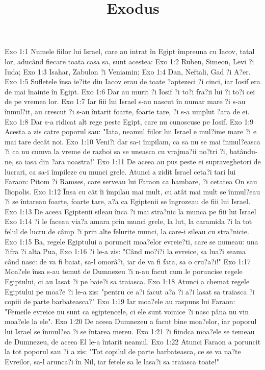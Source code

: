 

\title{Exodus}

Exo 1:1  Numele fiilor lui Israel, care au intrat în Egipt împreuna cu Iacov, tatal lor, aducând fiecare toata casa sa, sunt acestea:
Exo 1:2  Ruben, Simeon, Levi ?i Iuda;
Exo 1:3  Isahar, Zabulon ?i Veniamin;
Exo 1:4  Dan, Neftali, Gad ?i A?er.
Exo 1:5  Sufletele însa ie?ite din Iacov erau de toate ?aptezeci ?i cinci, iar Iosif era de mai înainte în Egipt.
Exo 1:6  Dar au murit ?i Iosif ?i to?i fra?ii lui ?i to?i cei de pe vremea lor.
Exo 1:7  Iar fiii lui Israel s-au nascut în numar mare ?i s-au înmul?it, au crescut ?i s-au întarit foarte, foarte tare, ?i s-a umplut ?ara de ei.
Exo 1:8  Dar s-a ridicat alt rege peste Egipt, care nu cunoscuse pe Iosif.
Exo 1:9  Acesta a zis catre poporul sau: "Iata, neamul fiilor lui Israel e mul?ime mare ?i e mai tare decât noi.
Exo 1:10  Veni?i dar sa-i împilam, ca sa nu se mai înmul?easca ?i ca nu cumva la vreme de razboi sa se uneasca cu vrajma?ii no?tri ?i, batându-ne, sa iasa din ?ara noastra!"
Exo 1:11  De aceea au pus peste ei supraveghetori de lucrari, ca sa-i împileze cu munci grele. Atunci a zidit Israel ceta?i tari lui Faraon: Pitom ?i Ramses, care serveau lui Faraon ca hambare, ?i cetatea On sau Iliopolis.
Exo 1:12  Însa cu cât îi împilau mai mult, cu atât mai mult se înmul?eau ?i se întareau foarte, foarte tare, a?a ca Egiptenii se îngrozeau de fiii lui Israel.
Exo 1:13  De aceea Egiptenii sileau înca ?i mai stra?nic la munca pe fiii lui Israel
Exo 1:14  ?i le faceau via?a amara prin munci grele, la lut, la caramida ?i la tot felul de lucru de câmp ?i prin alte felurite munci, la care-i sileau cu stra?nicie.
Exo 1:15  Ba, regele Egiptului a poruncit moa?elor evreie?ti, care se numeau: una ?ifra ?i alta Pua,
Exo 1:16  ?i le-a zis: "Când mo?i?i la evreice, sa lua?i seama când nasc: de va fi baiat, sa-l omorâ?i, iar de va fi fata, sa o cru?a?i!"
Exo 1:17  Moa?ele însa s-au temut de Dumnezeu ?i n-au facut cum le poruncise regele Egiptului, ci au lasat ?i pe baie?i sa traiasca.
Exo 1:18  Atunci a chemat regele Egiptului pe moa?e ?i le-a zis: "pentru ce a?i facut a?a ?i a?i lasat sa traiasca ?i copiii de parte barbateasca?"
Exo 1:19  Iar moa?ele au raspuns lui Faraon: "Femeile evreice nu sunt ca egiptencele, ci ele sunt voinice ?i nasc pâna nu vin moa?ele la ele".
Exo 1:20  De aceea Dumnezeu a facut bine moa?elor, iar poporul lui Israel se înmul?ea ?i se întarea mereu.
Exo 1:21  ?i fiindca moa?ele se temeau de Dumnezeu, de aceea El le-a întarit neamul.
Exo 1:22  Atunci Faraon a poruncit la tot poporul sau ?i a zis: "Tot copilul de parte barbateasca, ce se va na?te Evreilor, sa-l arunca?i în Nil, iar fetele sa le lasa?i sa traiasca toate!"
